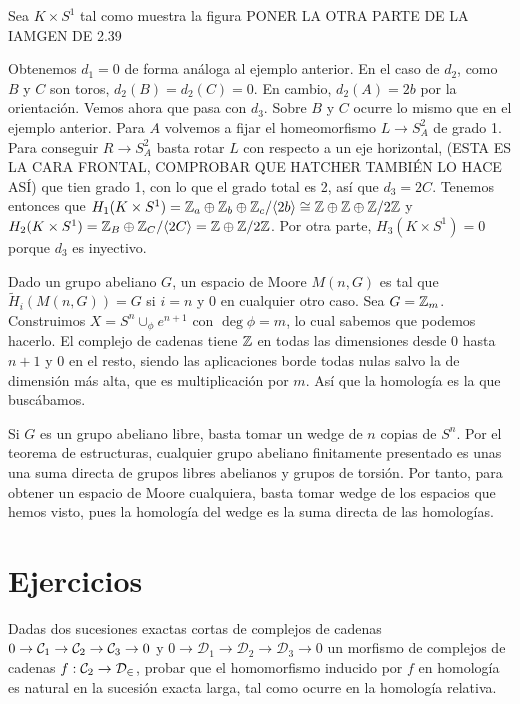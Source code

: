\documentclass[TA.tex]{subfiles}
\begin{document}
\begin{ej}
Sea $K\times S^1$ tal como muestra la figura PONER LA OTRA PARTE DE LA IAMGEN DE 2.39

Obtenemos $d_1=0$ de forma análoga al ejemplo anterior. En el caso de $d_2$, como $B$ y $C$ son toros, $d_2(B)=d_2(C)=0$. En cambio, $d_2(A)=2b$ por la orientación. Vemos ahora que pasa con $d_3$. Sobre $B$ y $C$ ocurre lo mismo que en el ejemplo anterior. Para $A$ volvemos a fijar el homeomorfismo $L\to S^2_A$ de grado 1. Para conseguir $R\to S^2_A$ basta rotar $L$ con respecto a un eje horizontal, (ESTA ES LA CARA FRONTAL, COMPROBAR QUE HATCHER TAMBIÉN LO HACE ASÍ) que tien grado 1, con lo que el grado total es 2, así que $d_3=2C$. Tenemos entonces que $H_1(K\times S^1)=\mathbb{Z}_a\oplus \mathbb{Z}_b\oplus \mathbb{Z}_c/\langle{2b}\rangle\cong\mathbb{Z}\oplus\mathbb{Z}\oplus\mathbb{Z}/2\mathbb{Z}$ y $H_2(K\times S^1)=\mathbb{Z}_B\oplus\mathbb{Z}_C/\langle{2C}\rangle=\mathbb{Z}\oplus\mathbb{Z}/2\mathbb{Z}$. Por otra parte, $H_3(K\times S^1)=0$ porque $d_3$ es inyectivo.  
\end{ej}

\begin{ej}
Dado un grupo abeliano $G$, un espacio de Moore $M(n,G)$ es tal que $\widetilde{H}_i(M(n,G))=G$ si $i=n$ y 0 en cualquier otro caso. Sea $G=\mathbb{Z}_m$. Construimos $X=S^n\cup_{\phi}e^{n+1}$ con $\deg\phi=m$, lo cual sabemos que podemos hacerlo. El complejo de cadenas tiene $\mathbb{Z}$ en todas las dimensiones desde 0 hasta $n+1$ y 0 en el resto, siendo las aplicaciones borde todas nulas salvo la de dimensión más alta, que es multiplicación por $m$. Así que la homología es la que buscábamos.

Si $G$ es un grupo abeliano libre, basta tomar un wedge de $n$ copias de $S^n$. Por el teorema de estructuras, cualquier grupo abeliano finitamente presentado es unas una suma directa de grupos libres abelianos y grupos de torsión. Por tanto, para obtener un espacio de Moore cualquiera, basta tomar wedge de los espacios que hemos visto, pues la homología del wedge es la suma directa de las homologías.
\end{ej}




\section{Ejercicios}
\begin{ejer}
Dadas dos sucesiones exactas cortas de complejos de cadenas $0\to \mathcal{C}_1\to \mathcal{C}_2\to\mathcal{C}_3\to 0$ y $0\to \mathcal{D}_1\to \mathcal{D}_2\to\mathcal{D}_3\to 0$ un morfismo de complejos de cadenas $f:\mathcal{C}_2\to\mathcal{D_2}$, probar que el homomorfismo inducido por $f$ en homología es natural en la sucesión exacta larga, tal como ocurre en la homología relativa. 
\end{ejer}
\end{document}
